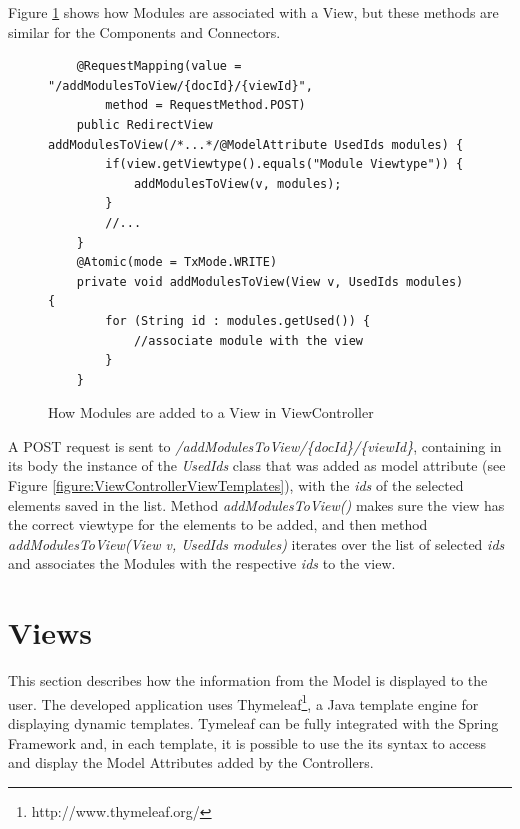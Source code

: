 Figure \ref{figure:ViewControllerAddModules} shows how Modules are associated with a View, but these methods are similar for the Components and Connectors. 
\begin{figure}[h]
\lstset{style=customjava}
\begin{lstlisting}
	@RequestMapping(value = "/addModulesToView/{docId}/{viewId}", 
		method = RequestMethod.POST)
	public RedirectView addModulesToView(/*...*/@ModelAttribute UsedIds modules) {
		if(view.getViewtype().equals("Module Viewtype")) {
			addModulesToView(v, modules);
		}
		//...
	}
	@Atomic(mode = TxMode.WRITE)
	private void addModulesToView(View v, UsedIds modules) {
		for (String id : modules.getUsed()) {
			//associate module with the view
		}
	}	
\end{lstlisting}
\caption{How Modules are added to a View in ViewController}
\label{figure:ViewControllerAddModules}
\end{figure}
A POST request is sent to \textit{/addModulesToView/\{docId\}/\{viewId\}}, containing in its body the instance of the \textit{UsedIds} class that was added as model attribute (see Figure \ref{figure:ViewControllerViewTemplates}), with the \textit{ids} of the selected elements saved in the list. Method \textit{addModulesToView()} makes sure the view has the correct viewtype for the elements to be added, and then method \textit{addModulesToView(View v, UsedIds modules)} iterates over the list of selected \textit{ids} and associates the Modules with the respective \textit{ids} to the view.

\section{Views}
\label{section:Views}
This section describes how the information from the Model is displayed to the user. The developed application uses Thymeleaf\footnote{http://www.thymeleaf.org/}, a Java template engine for displaying dynamic templates. Tymeleaf can be fully integrated with the Spring Framework and, in each template, it is possible to use the its syntax to access and display the Model Attributes added by the Controllers. 

